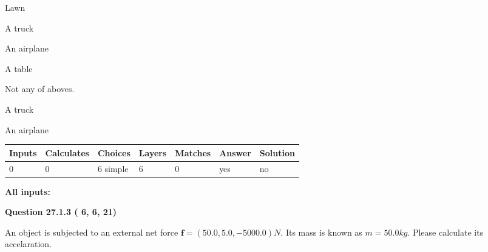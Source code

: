 \documentclass[12pt]{article}
\begin{document}
 
Lawn
 
 
A truck
 
 
An airplane
 
 
A table
 
 
  Not any of aboves.
 
 
\noindent{}
 
 
A truck
 
 
An airplane
 
 
\noindent{}
 
 
 
\vspace{0.3in}
   
   
   
   
\noindent\begin{tabular}{|l|l|l|l|l|l|l|}
 \hline
Inputs & Calculates & Choices & Layers & Matches & Answer & Solution \\ \hline
           0 & 
           0 & 
           6
  simple  
  & 
           6 & 
           0 & 
  yes & 
  no 
  \\ \hline
 \end{tabular}
   
   
   
   
\noindent{}
   
   
   
   
\noindent\vspace{0.1in}\hspace{-0.08in} {\textbf{\Large{All inputs: }}}
   
   
  
\vspace{0.2in}
  
{\textbf{\Large{Question
27.1.3 
 (          6,          6,         21)
}}}
  
  
 
An object is subjected to an external net force $\mathbf{f}=(
50.0,  %
5.0,
-5000.0  )N$. Its mass is known as
$m= %
50.0 kg$. Please calculate its accelaration.
 
 
 
\end{document}
